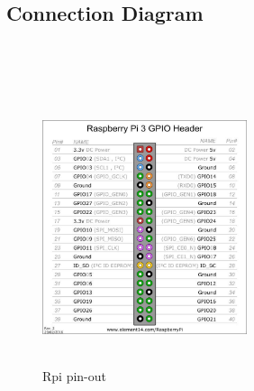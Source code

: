 \documentclass[a4paper,12pt,oneside]{book}
\begin{document}
\subsection*{Connection Diagram}\\\\
\begin{figure}[!htb]
\includegraphics[width=6cm,height=8cm]{pigpio.jpg}
\caption{Rpi pin-out}
\endminipage\hfill
{}
\endminipage\hfill
{}

\end{figure}
\end{document}
